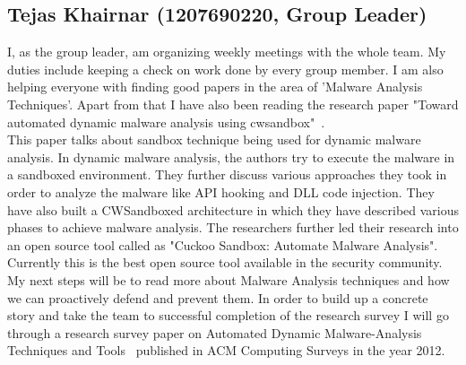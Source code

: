 \documentclass[11pt]{article}
\begin{document}
		\subsection{Tejas Khairnar (1207690220, Group Leader)}
		I, as the group leader, am organizing weekly meetings with the whole team. My duties include keeping a check on work done by every group member.
		I am also helping everyone with finding good papers in the area of 'Malware Analysis Techniques'. Apart from that I have also been reading the research paper "Toward automated dynamic malware analysis using cwsandbox"~\cite{willems2007toward}. \\
		This paper talks about sandbox technique being used for dynamic malware analysis. In dynamic malware analysis, the authors try to execute the malware in a sandboxed environment. They further discuss various approaches they took in order to analyze the malware like API hooking and DLL code injection. They have also built a CWSandboxed architecture in which they have described various phases to achieve malware analysis. The researchers further led their research into an open source tool called as "Cuckoo Sandbox: Automate Malware Analysis". Currently this is the best open source tool available in the security community.\\
		My next steps will be to read more about Malware Analysis techniques and how we can proactively defend and prevent them. In order to build up a concrete story and take the team to successful completion of the research survey I will go through a research survey paper on Automated Dynamic Malware-Analysis Techniques and Tools~\cite{egele2012survey} published in ACM Computing Surveys in the year 2012. 		
\end{document}
